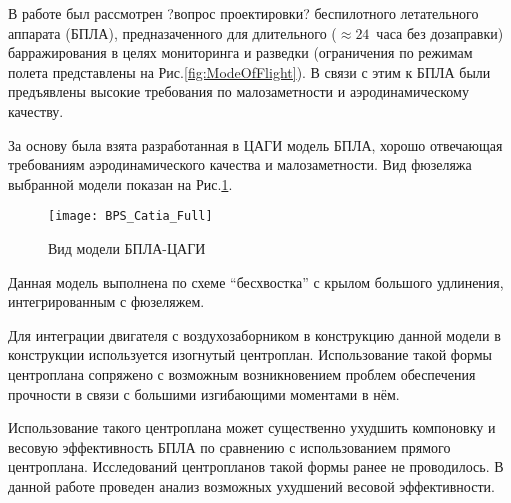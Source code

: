 

В работе был рассмотрен ?вопрос проектировки? беспилотного летательного аппарата (БПЛА), предназаченного для длительного ($\approx24$~часа без дозаправки) барражирования в целях мониторинга и разведки (ограничения по режимам полета представлены на Рис.\ref{fig:ModeOfFlight}). В связи с этим к БПЛА были предъявлены высокие требования по малозаметности и аэродинамическому качеству. 


За основу была взята разработанная в ЦАГИ модель БПЛА, хорошо отвечающая требованиям аэродинамического качества и малозаметности. Вид фюзеляжа выбранной модели показан на Рис.\ref{fig:BPLA_TSAGI}.
 

  
  



\begin{figure}[ht]
\centering
\texttt{[image: BPS\_Catia\_Full]}
\caption{Вид модели БПЛА-ЦАГИ}
\label{fig:BPLA_TSAGI}
\end{figure}

Данная модель выполнена по схеме ``бесхвостка'' с крылом большого удлинения, интегрированным с фюзеляжем. 

Для интеграции двигателя с воздухозаборником в конструкцию данной модели в конструкции используется изогнутый центроплан. Использование такой формы центроплана сопряжено с возможным возникновением проблем обеспечения прочности в связи с большими изгибающими моментами в нём. 

Использование такого центроплана может существенно ухудшить компоновку и весовую эффективность БПЛА по сравнению с использованием прямого центроплана. Исследований центропланов такой формы ранее не проводилось. В данной работе проведен анализ возможных ухудшений весовой эффективности. 
 




